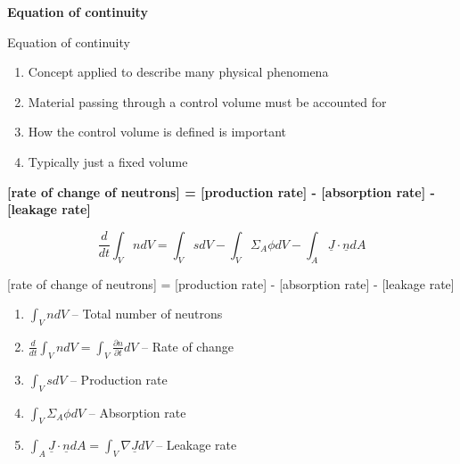 \documentclass[aspectratio=1610,pdftex,dvipsnames,compress,xcolor={dvipsnames}]{beamer}
\begin{document}
\begin{frame}[plain]{}
    \centering\LARGE\textbf{Equation of continuity}
\end{frame}


\addtocounter{framenumber}{-1} 
\begin{frame}{Equation of continuity}
    \begin{enumerate}[series=outerlist,topsep=0pt,itemsep=21pt,leftmargin=*,label=(\arabic*)]
        \item[]Concept applied to describe many physical phenomena
        \item[]Material passing through a control volume must be accounted for
        \item[]How the control volume is defined is important
        \item[]Typically just a fixed volume
    \end{enumerate}
\end{frame}




\begin{frame}[plain]{}
    \centering\textbf{[rate of change of neutrons] = [production rate] - [absorption rate] - [leakage rate]}
\end{frame}


\begin{frame}[plain]{}
    \LARGE
    \begin{equation*}
        \frac{d}{dt} \int_V n dV =
        \int_V s dV - \int_V \Sigma_A \phi dV - \int_A \underline{J} \cdot \underline{n} dA
    \end{equation*}
\end{frame}


\addtocounter{framenumber}{-2} 
\begin{frame}{\normalsize[rate of change of neutrons] = [production rate] - [absorption rate] - [leakage rate]}
    \begin{enumerate}[series=outerlist,topsep=0pt,itemsep=21pt,leftmargin=*,label=(\arabic*)]
        \item[]$\int_V n dV$ -- Total number of neutrons
        \item[]$\frac{d}{dt} \int_V n dV = \int_V \frac{\partial n}{\partial t} dV$ -- Rate of change
        \item[]$\int_V sdV$ -- Production rate
        \item[]$\int_V \Sigma_A \phi dV$ -- Absorption rate
        \item[]$\int_A \underline{J} \cdot \underline{n} dA = \int_V \nabla \underline{J} dV$ -- Leakage rate
    \end{enumerate}
\end{frame}
\end{document}
